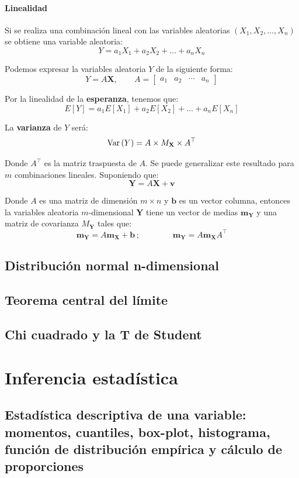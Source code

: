 \documentclass[a4paper]{book}
\renewcommand{\vec}[1]{\mathbf{#1}} %
\begin{document}
\subsubsection{Linealidad}
Si se realiza una combinación lineal con las variables aleatorias $\left( X_1,X_2, \dots , X_n \right)$ se obtiene una variable aleatoria:
\[ Y = a_1X_1 + a_2X_2 + \dots + a_nX_n \]

Podemos expresar la variables aleatoria $Y$ de la siguiente forma:
\[ Y = A \vec{X}, \qquad A = \left[ 
\begin{matrix}
	a_1 & a_2 & \cdots & a_n
\end{matrix} \right] \]

Por la linealidad de la \textbf{esperanza}, tenemos que:
\[ E \left[ Y \right] = a_1E \left[ X_1 \right] + a_2 E \left[ X_2 \right] + \dots + a_n E \left[ X_n \right] \]

La \textbf{varianza} de $Y$ será:
\[ \Var \left( Y \right) = A \times M_{\vec{X}} \times A ^{\top} \]

Donde $A ^{\top} $ es la matriz traspuesta de $A$. Se puede generalizar este resultado para $m$ combinaciones lineales. Suponiendo que:
\[ \vec{Y} = A \vec{X} + \vec{v} \]
 
Donde $A$ es una matriz de dimensión $m \times n$ y $\vec{b}$ es un vector columna, entonces la variables aleatoria $m$-dimensional $\vec{Y}$ tiene un vector de medias $\vec{m}_{\vec{Y}}$ y una matriz de covarianza $M_{\vec{Y}}$ tales que:
\[ \vec{m}_{\vec{Y}} = A \vec{m}_{\vec{X}} + \vec{b} \, ; \qquad \qquad \vec{m}_{\vec{Y}} = A \vec{m}_{\vec{X}} A ^{\top} \]


\section{Distribución normal n-dimensional}
\section{Teorema central del límite}
\section{Chi cuadrado y la T de Student}


\chapter{Inferencia estadística}

\section{Estadística descriptiva de una variable: momentos, cuantiles, box-plot, histograma, función de distribución empírica y cálculo de proporciones}
\end{document}
